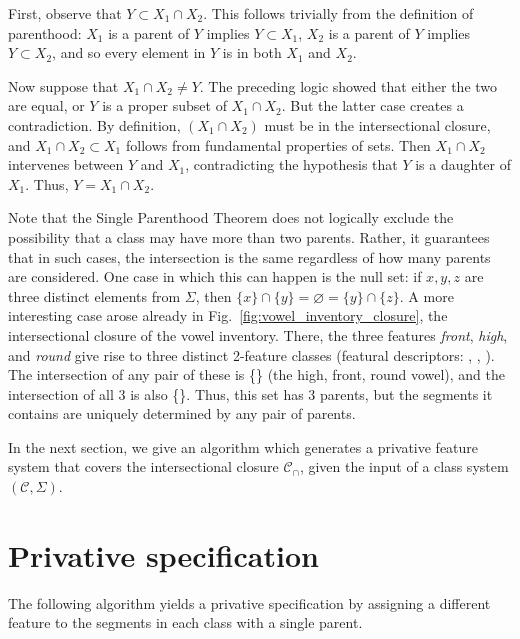 \documentclass[11pt, oneside]{article}   	%
\begin{document}
First, observe that $Y \subset X_1 \cap X_2$. This follows trivially from the definition of parenthood: $X_1$ is a parent of $Y$ implies $Y \subset X_1$, $X_2$ is a parent of $Y$ implies $Y \subset X_2$, and so every element in $Y$ is in both $X_1$ and $X_2$.

Now suppose that $X_1 \cap X_2 \neq Y$. The preceding logic showed that either the two are equal, or $Y$ is a proper subset of $X_1 \cap X_2$. But the latter case creates a contradiction. By definition, $(X_1 \cap X_2)$ must be in the intersectional closure, and $X_1 \cap X_2 \subset X_1$ follows from fundamental properties of sets. Then $X_1 \cap X_2$ intervenes between $Y$ and $X_1$, contradicting the hypothesis that $Y$ is a daughter of $X_1$. Thus, $Y = X_1 \cap X_2$.
	
\vspace{\baselineskip} Note that the Single Parenthood Theorem does not logically exclude the possibility that a class may have more than two parents. Rather, it guarantees that in such cases, the intersection is the same regardless of how many parents are considered. One case in which this can happen is the null set: if $x, y, z$ are three distinct elements from $\Sigma$, then $\{ x \} \cap \{ y \} = \varnothing = \{ y \} \cap \{ z \}$. A more interesting case arose already in Fig.~\ref{fig:vowel_inventory_closure}, the intersectional closure of the vowel inventory. There, the three features \textit{front}, \textit{high}, and \textit{round} give rise to three distinct 2-feature classes (featural descriptors: , , ). The intersection of any pair of these is \{\} (the high, front, round vowel), and the intersection of all 3 is also \{\}. Thus, this set has 3 parents, but the segments it contains are uniquely determined by any pair of parents.

In the next section, we give an algorithm which generates a privative feature system that covers the intersectional closure $\mathcal C_\cap$, given the input of a class system $(\mathcal C, \Sigma)$.

 \section{Privative specification}

The following algorithm yields a privative specification by assigning a different feature  to the segments in each class with a single parent.
 
\end{document}

